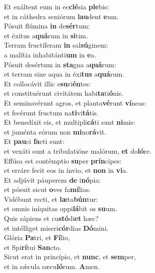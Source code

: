 \evenverse Et exáltent eum in ec\textbf{clé}sia \textbf{ple}bis:~\*\\
\evenverse et in cáthedra seniórum \textbf{lau}dent \textbf{e}um.\\
\oddverse Pósuit flúmina \textbf{in} de\textbf{sér}tum:~\*\\
\oddverse et éxitus a\textbf{quá}rum in \textbf{si}tim.\\
\evenverse Terram fructíferam \textbf{in} sal\textbf{sú}ginem:~\*\\
\evenverse a malítia inhabitánti\textbf{um} in \textbf{e}a.\\
\oddverse Pósuit desértum in \textbf{sta}gna a\textbf{quá}rum:~\*\\
\oddverse et terram sine aqua in éxi\textbf{tus} a\textbf{quá}rum.\\
\evenverse Et collocávit illic e\textbf{su}ri\textbf{én}tes:~\*\\
\evenverse et constituérunt civitátem habi\textbf{ta}ti\textbf{ó}nis.\\
\oddverse Et seminavérunt agros, et planta\textbf{vé}runt \textbf{ví}neas:~\*\\
\oddverse et fecérunt fructum na\textbf{ti}vi\textbf{tá}tis.\\
\evenverse Et benedíxit eis, et multipli\textbf{cá}ti sunt \textbf{ni}mis:~\*\\
\evenverse et juménta eórum non \textbf{mi}no\textbf{rá}vit.\\
\oddverse Et \textbf{pau}ci \textbf{fa}cti sunt:~\*\\
\oddverse et vexáti sunt a tribulatióne malórum, \textbf{et} do\textbf{ló}re.\\
\evenverse Effúsa est contémptio \textbf{su}per \textbf{prín}cipes:~\*\\
\evenverse et erráre fecit eos in ínvio, et \textbf{non} in \textbf{vi}a.\\
\oddverse Et adjúvit páuperem \textbf{de} i\textbf{nó}pia:~\*\\
\oddverse et pósuit sicut \textbf{o}ves fa\textbf{mí}lias.\\
\evenverse Vidébunt recti, et \textbf{læ}ta\textbf{bún}tur:~\*\\
\evenverse et omnis iníquitas oppi\textbf{lá}bit os \textbf{su}um.\\
\oddverse Quis sápiens et cu\textbf{stó}di\textbf{et} hæc?~\*\\
\oddverse et intélliget miseri\textbf{cór}dias \textbf{Dó}mini.\\
\evenverse Glória \textbf{Pa}tri, et \textbf{Fí}lio,~\*\\
\evenverse et Spi\textbf{rí}tui \textbf{San}cto.\\
\oddverse Sicut erat in princípio, et \textbf{nunc}, et \textbf{sem}per,~\*\\
\oddverse et in sǽcula sæcu\textbf{ló}rum. \textbf{A}men.\\
